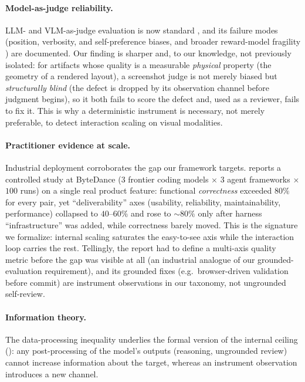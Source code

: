 \paragraph{Model-as-judge reliability.} LLM- and VLM-as-judge evaluation is now standard \citep{zheng2023judging}, and its failure modes (position, verbosity, and self-preference biases, and broader reward-model fragility \citep{casper2023open}) are documented. Our finding is sharper and, to our knowledge, not previously isolated: for artifacts whose quality is a measurable \emph{physical} property (the geometry of a rendered layout), a screenshot judge is not merely biased but \emph{structurally blind} (the defect is dropped by its observation channel before judgment begins), so it both fails to score the defect and, used as a reviewer, fails to fix it. This is why a deterministic instrument is necessary, not merely preferable, to detect interaction scaling on visual modalities.

\paragraph{Practitioner evidence at scale.} Industrial deployment corroborates the gap our framework targets. \citet{hong2026aicoding} reports a controlled study at ByteDance ($3$ frontier coding models $\times$ $3$ agent frameworks $\times$ $100$ runs) on a single real product feature: functional \emph{correctness} exceeded $80\%$ for every pair, yet ``deliverability'' axes (usability, reliability, maintainability, performance) collapsed to $40$--$60\%$ and rose to ${\sim}80\%$ only after harness ``infrastructure'' was added, while correctness barely moved. This is the signature we formalize: internal scaling saturates the easy-to-see axis while the interaction loop carries the rest. Tellingly, the report had to define a multi-axis quality metric before the gap was visible at all (an industrial analogue of our grounded-evaluation requirement), and its grounded fixes (e.g.\ browser-driven validation before commit) are instrument observations in our taxonomy, not ungrounded self-review.

\paragraph{Information theory.} The data-processing inequality \citep{cover2006elements} underlies the formal version of the internal ceiling (): any post-processing of the model's outputs (reasoning, ungrounded review) cannot increase information about the target, whereas an instrument observation introduces a new channel.
